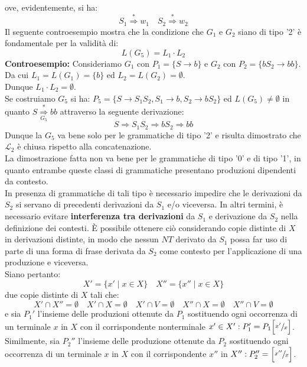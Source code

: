 \documentclass[12pt]{report}
\begin{document}
{{{\begin{enumerate}
\[			\]
			ove, evidentemente, si ha:
			\[
			S_1 \overset{*}{\Rightarrow} w_1 \quad S_2 \overset{*}{\Rightarrow} w_2
			\]
			Il seguente controesempio mostra che la condizione che $G_1$ e $G_2$ siano di tipo '2' è fondamentale per la validità di:
			\[
			L(G_5) = L_1\cdot L_2
			\]
			\textbf{Controesempio:} Consideriamo $G_1$ con $P_1 = \{S \to b\}$ e $G_2$ con $P_2 = \{bS_2 \to bb\}$. Da cui $L_1 = L(G_1) = \{b\}$ ed $L_2 = L(G_2) = \emptyset$. \\
			Dunque $L_1 \cdot L_2 = \emptyset$. \\
			Se costruiamo $G_5$ si ha: $P_5 = \{ S \to S_1S_2, S_1 \to b, S_2 \to bS_2\}$ ed $L(G_5) \neq \emptyset$ in quanto $S \overset{*}{\underset{G_5}{\Rightarrow}} bb$ attraverso la seguente derivazione:
			\[
			S \Rightarrow S_1S_2 \Rightarrow bS_2 \Rightarrow bb
			\]
			Dunque la $G_5$ va bene solo per le grammatiche di tipo '2' e risulta dimostrato che $\mathcal{L}_2$ è chiusa rispetto alla concatenazione. \\
			La dimostrazione fatta non va bene per le grammatiche di tipo '0' e di tipo '1', in quanto entrambe queste classi di grammatiche presentano produzioni dipendenti da contesto. \\
			In presenza di grammatiche di tali tipo è necessario impedire che le derivazioni da $S_2$ si servano di precedenti derivazioni da $S_1$ e/o viceversa. In altri termini, è necessario evitare \textbf{interferenza tra derivazioni} da $S_1$ e derivazione da $S_2$ nella definizione dei contesti. È possibile ottenere ciò considerando copie distinte di $X$ in derivazioni distinte, in modo che nessun $NT$ derivato da $S_1$ possa far uso di parte di una forma di frase derivata da $S_2$ come contesto per l'applicazione di una produzione e viceversa. \\
			Siano pertanto:
			\[
			X'=\{x' \mid x \in X\} \quad X'' = \{x'' \mid x \in X\}
			\]
			due copie distinte di $X$ tali che:
			\[
			X' \cap X'' = \emptyset \quad X' \cap X = \emptyset \quad X' \cap V = \emptyset \quad X'' \cap X = \emptyset \quad X''\cap V = \emptyset
			\]
			e sia $P_1'$ l'insieme delle produzioni ottenute da $P_1$ sostituendo ogni occorrenza di un terminale $x$ in $X$ con il corrispondente nonterminale $x'\in X': P_1' = P_1\Big[\sfrac{x'}{x} \Big]$. \\
			Similmente, sia $P_2''$ l'insieme delle produzione ottenute da $P_2$ sostituendo ogni occorrenza di un terminale $x$ in $X$ con il corrispondente $x''$ in $X'': P_2'' = \Big[\sfrac{x''}{x}\Big]$. \\

\end{enumerate}}}}
\end{document}
